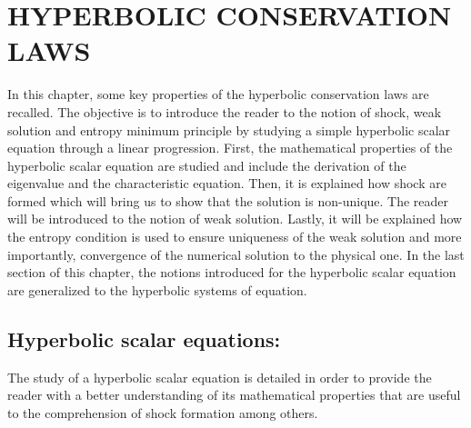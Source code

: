 %
%
%

%
\chapter{\uppercase {Hyperbolic conservation laws}}
%
In this chapter, some key properties of the hyperbolic conservation laws are recalled. The objective is to introduce the reader to the notion of shock, weak solution and entropy minimum principle by studying a simple hyperbolic scalar equation through a linear progression. First, the mathematical properties of the hyperbolic scalar equation are studied and include the derivation of the eigenvalue and the characteristic equation. Then, it is explained how shock are formed which will bring us to show that the solution is non-unique. The reader will be introduced to the notion of weak solution. Lastly, it will be explained how the entropy condition is used to ensure uniqueness of the weak solution and more importantly, convergence of the numerical solution to the physical one. In the last section of this chapter, the notions introduced for the hyperbolic scalar equation are generalized to the hyperbolic systems of equation.
\section{Hyperbolic scalar equations:}\label{sec:hyp_scalar_sct1b}
The study of a hyperbolic scalar equation is detailed in order to provide the reader with a better understanding of its mathematical properties that are useful to the comprehension of shock formation among others.
